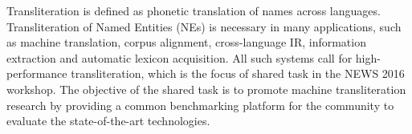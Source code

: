 Transliteration is defined as phonetic translation of names across languages. Transliteration of Named Entities (NEs) is necessary in many applications, such as machine translation, corpus alignment, cross-language IR, information extraction and automatic lexicon acquisition. All such systems call for high-performance transliteration, which is the focus of shared task in the NEWS 2016 workshop. The objective of the shared task is to promote machine transliteration research by providing a common benchmarking platform for the community to evaluate the state-of-the-art technologies.
